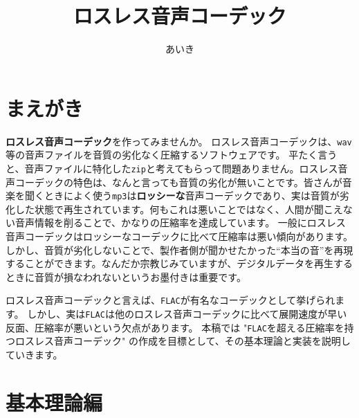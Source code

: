 \documentclass[uplatex,dvipdfmx,b5j,10pt]{jsbook}
\title{ロスレス音声コーデック}
\author{あいき}
\theoremstyle{definition}
\newcommand{\titlefont}[0]{\usefont{T1}{phv}{b}{n}\gtfamily}
\begin{document}

\chapter*{まえがき}

\textbf{ロスレス音声コーデック}を作ってみませんか。
ロスレス音声コーデックは、\texttt{wav}等の音声ファイルを音質の劣化なく圧縮するソフトウェアです。
平たく言うと、音声ファイルに特化した\texttt{zip}と考えてもらって問題ありません。ロスレス音声コーデックの特色は、なんと言っても音質の劣化が無いことです。皆さんが音楽を聞くときによく使う\texttt{mp3}は\textbf{ロッシーな}音声コーデックであり、実は音質が劣化した状態で再生されています。何もこれは悪いことではなく、人間が聞こえない音声情報を削ることで、かなりの圧縮率を達成しています。
一般にロスレス音声コーデックはロッシーなコーデックに比べて圧縮率は悪い傾向があります。しかし、音質が劣化しないことで、製作者側が聞かせたかった``本当の音''を再現することができます。なんだか宗教じみていますが、デジタルデータを再生するときに音質が損なわれないというお墨付きは重要です。

ロスレス音声コーデックと言えば、\texttt{FLAC}\cite{flac}が有名なコーデックとして挙げられます。
しかし、実は\texttt{FLAC}は他のロスレス音声コーデック\cite{mpeg4als,wavpack,la,optimfrog,tak,tta,monkeysaudio}に比べて展開速度が早い反面、圧縮率が悪いという欠点があります。
本稿では "\texttt{FLAC}を超える圧縮率を持つロスレス音声コーデック" の作成を目標として、その基本理論と実装を説明していきます。

\tableofcontents

\chapter{基本理論編}
\end{document}
